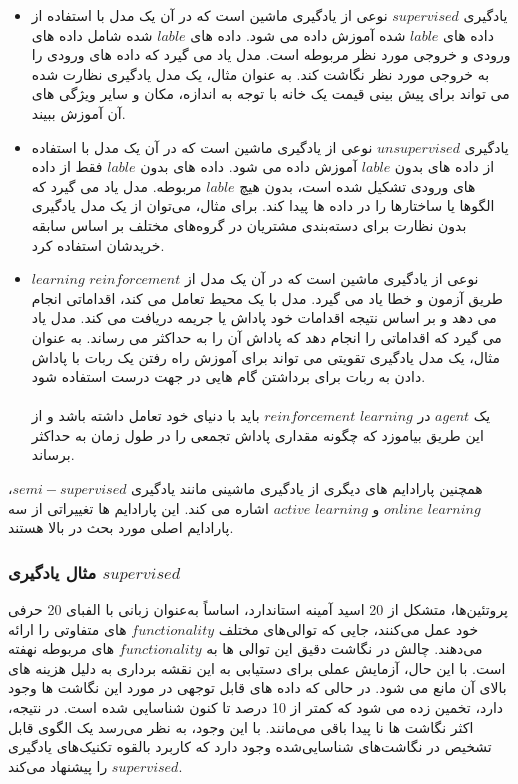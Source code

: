 \documentclass[12pt]{article}
\begin{document}
\begin{itemize}
    \item یادگیری $supervised$ نوعی از یادگیری ماشین است که در آن یک مدل با استفاده از داده های $lable$ شده آموزش داده می شود. داده های $lable$ شده شامل داده های ورودی و خروجی مورد نظر مربوطه است. مدل یاد می گیرد که داده های ورودی را به خروجی مورد نظر نگاشت کند. به عنوان مثال، یک مدل یادگیری نظارت شده می تواند برای پیش بینی قیمت یک خانه با توجه به اندازه، مکان و سایر ویژگی های آن آموزش ببیند.
    \item یادگیری $unsupervised$ نوعی از یادگیری ماشین است که در آن یک مدل با استفاده از داده های بدون $lable$ آموزش داده می شود. داده های بدون $lable$ فقط از داده های ورودی تشکیل شده است، بدون هیچ $lable$ مربوطه. مدل یاد می گیرد که الگوها یا ساختارها را در داده ها پیدا کند. برای مثال، می‌توان از یک مدل یادگیری بدون نظارت برای دسته‌بندی مشتریان در گروه‌های مختلف بر اساس سابقه خریدشان استفاده کرد.
    \item $learning$ $reinforcement$ نوعی از یادگیری ماشین است که در آن یک مدل از طریق آزمون و خطا یاد می گیرد. مدل با یک محیط تعامل می کند، اقداماتی انجام می دهد و بر اساس نتیجه اقدامات خود پاداش یا جریمه دریافت می کند. مدل یاد می گیرد که اقداماتی را انجام دهد که پاداش آن را به حداکثر می رساند. به عنوان مثال، یک مدل یادگیری تقویتی می تواند برای آموزش راه رفتن یک ربات با پاداش دادن به ربات برای برداشتن گام هایی در جهت درست استفاده شود.
    \\
    \\
    یک $agent$ در $learning$ $reinforcement$ باید با دنیای خود تعامل داشته باشد و از این طریق بیاموزد که چگونه مقداری پاداش تجمعی را در طول زمان به حداکثر برساند.
    
\end{itemize}

همچنین پارادایم های دیگری از یادگیری ماشینی مانند یادگیری $semi-supervised$، $learning$ $online$ و $learning$ $active$ اشاره می کند. این پارادایم ها تغییراتی از سه پارادایم اصلی مورد بحث در بالا هستند.

\subsubsection*{مثال یادگیری $supervised$}
پروتئین‌ها، متشکل از 20 اسید آمینه استاندارد، اساساً به‌عنوان زبانی با الفبای 20 حرفی خود عمل می‌کنند، جایی که توالی‌های مختلف $functionality$ های متفاوتی را ارائه می‌دهند. چالش در نگاشت دقیق این توالی ها به $functionality$ های مربوطه نهفته است. با این حال، آزمایش عملی برای دستیابی به این نقشه برداری به دلیل هزینه های بالای آن مانع می شود. در حالی که داده های قابل توجهی در مورد این نگاشت ها وجود دارد، تخمین زده می شود که کمتر از 10 درصد تا کنون شناسایی شده است. در نتیجه، اکثر نگاشت ها نا پیدا باقی می‌مانند. با این وجود، به نظر می‌رسد یک الگوی قابل تشخیص در نگاشت‌های شناسایی‌شده وجود دارد که کاربرد بالقوه تکنیک‌های یادگیری $supervised$ را پیشنهاد می‌کند.
\end{document}
